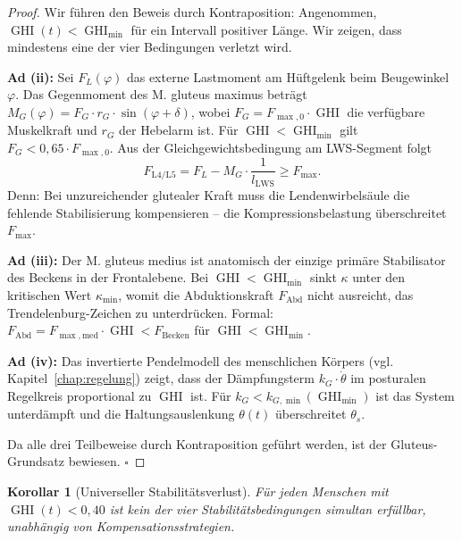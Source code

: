 ﻿\documentclass[12pt,a4paper]{report}
\theoremstyle{plain}
\newtheorem{korollar}[theorem]{Korollar}
\theoremstyle{definition}
\theoremstyle{remark}
\DeclareMathOperator{\GHI}{GHI}
\begin{document}
	\begin{proof}
		Wir führen den Beweis durch Kontraposition: Angenommen, $\GHI(t) < \GHI_{\min}$
		für ein Intervall positiver Länge. Wir zeigen, dass mindestens eine der
		vier Bedingungen verletzt wird.
		
		\textbf{Ad (ii):} Sei $F_L(\varphi)$ das externe Lastmoment am Hüftgelenk
		beim Beugewinkel $\varphi$. Das Gegenmoment des M. gluteus maximus beträgt
		$M_G(\varphi) = F_G \cdot r_G \cdot \sin(\varphi + \delta)$,
		wobei $F_G = F_{\max,0} \cdot \GHI$ die verfügbare Muskelkraft und
		$r_G$ der Hebelarm ist.
		Für $\GHI < \GHI_{\min}$ gilt $F_G < 0{,}65 \cdot F_{\max,0}$.
		Aus der Gleichgewichtsbedingung am LWS-Segment folgt
		\[
		F_{\mathrm{L4/L5}} = F_L - M_G \cdot \frac{1}{l_{\mathrm{LWS}}} \geq F_{\max}.
		\]
		Denn: Bei unzureichender glutealer Kraft muss die Lendenwirbelsäule
		die fehlende Stabilisierung kompensieren -- die Kompressionsbelastung
		überschreitet $F_{\max}$.
		
		\textbf{Ad (iii):} Der M. gluteus medius ist anatomisch der einzige
		primäre Stabilisator des Beckens in der Frontalebene.
		Bei $\GHI < \GHI_{\min}$ sinkt $\kappa$ unter den kritischen Wert
		$\kappa_{\min}$, womit die Abduktionskraft $F_{\mathrm{Abd}}$ nicht
		ausreicht, das Trendelenburg-Zeichen zu unterdrücken. Formal:
		$F_{\mathrm{Abd}} = F_{\max,\mathrm{med}} \cdot \GHI < F_{\mathrm{Becken}}$
		für $\GHI < \GHI_{\min}$.
		
		\textbf{Ad (iv):} Das invertierte Pendelmodell des menschlichen Körpers
		(vgl. Kapitel~\ref{chap:regelung}) zeigt, dass der Dämpfungsterm
		$k_G \cdot \dot\theta$ im posturalen Regelkreis proportional zu $\GHI$
		ist. Für $k_G < k_{G,\min}(\GHI_{\min})$ ist das System unterdämpft
		und die Haltungsauslenkung $\theta(t)$ überschreitet $\theta_s$.
		
		Da alle drei Teilbeweise durch Kontraposition geführt werden,
		ist der Gluteus-Grundsatz bewiesen. \hfill$\square$
	\end{proof}
	
	\begin{korollar}[Universeller Stabilitätsverlust]
		Für jeden Menschen mit $\GHI(t) < 0{,}40$ ist kein der vier Stabilitätsbedingungen
		simultan erfüllbar, unabhängig von Kompensationsstrategien.
	\end{korollar}
	
\end{document}
